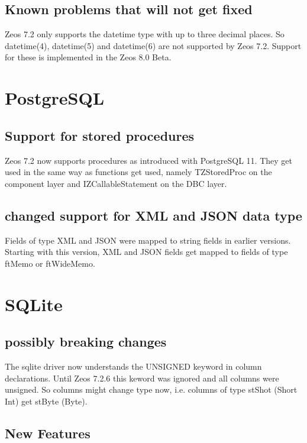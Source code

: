 \documentclass[a4paper,12pt,oneside]{book}
\begin{document}
\subsection{Known problems that will not get fixed}
Zeos 7.2 only supports the datetime type with up to three decimal places.
So datetime(4), datetime(5) and datetime(6) are not supported by Zeos 7.2.
Support for these is implemented in the Zeos 8.0 Beta.

\section{PostgreSQL}

\subsection{Support for stored procedures}

Zeos 7.2 now supports procedures as introduced with PostgreSQL 11.
They get used in the same way as functions get used, namely TZStoredProc on the component layer and IZCallableStatement on the DBC layer.

\subsection{changed support for XML and JSON data type}

Fields of type XML and JSON were mapped to string fields in earlier versions.
Starting with this version, XML and JSON fields get mapped to fields of type ftMemo or ftWideMemo.

\section{SQLite}

\subsection{possibly breaking changes}

The sqlite driver now understands the UNSIGNED keyword in column declarations.
Until Zeos 7.2.6 this keword was ignored and all columns were unsigned.
So columns might change type now, i.e. columns of type stShot (Short Int) get stByte (Byte).

\subsection{New Features}
\end{document}
